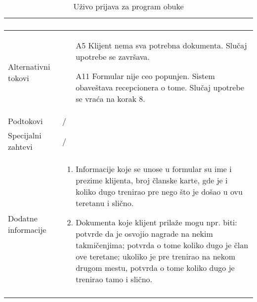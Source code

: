 \documentclass[../../main.tex]{subfiles}
\begin{document}
\begin{longtable}{| p{} | p{} |}
\begin{enumerate}
    \end{enumerate}\\
\hline
    Alternativni tokovi & 
    \begin{itemize}
        \item[A5] Klijent nema sva potrebna dokumenta. Slučaj upotrebe se završava. 
        \item[A11] Formular nije ceo popunjen. Sistem obaveštava recepcionera o tome. Slučaj upotrebe se vraća na korak 8.
    \end{itemize} \\
\hline
    Podtokovi & /\\
\hline
    Specijalni zahtevi & /\\
\hline
    Dodatne informacije &
    \begin{enumerate}
        \item Informacije koje se unose u formular su ime i prezime klijenta, broj članske karte, gde je i koliko dugo trenirao pre nego što je došao u ovu teretanu i slično.
        \item Dokumenta koje klijent prilaže mogu npr. biti: potvrde da je osvojio nagrade na nekim takmičenjima; potvrda o tome koliko dugo je član ove teretane; ukoliko je pre trenirao na nekom drugom mestu, potvrda o tome koliko dugo je trenirao tamo i slično.
    \end{enumerate}\\
\hline
\caption{Uživo prijava za program obuke}
\end{longtable}
\end{document}
